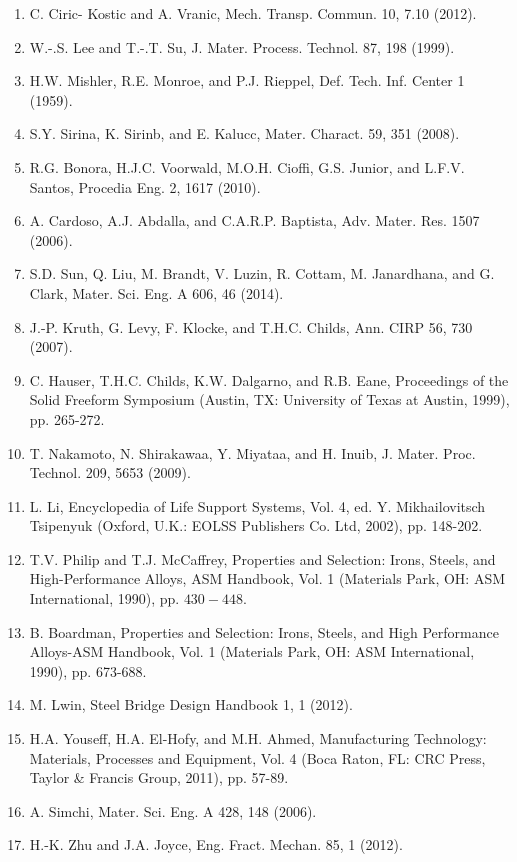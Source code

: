 \documentclass[10pt]{article}
\begin{document}
\begin{enumerate}
  \item C. Ciric- Kostic and A. Vranic, Mech. Transp. Commun. 10, 7.10 (2012).

  \item W.-.S. Lee and T.-.T. Su, J. Mater. Process. Technol. 87, 198 (1999).

  \item H.W. Mishler, R.E. Monroe, and P.J. Rieppel, Def. Tech. Inf. Center 1 (1959).

  \item S.Y. Sirina, K. Sirinb, and E. Kalucc, Mater. Charact. 59, 351 (2008).

  \item R.G. Bonora, H.J.C. Voorwald, M.O.H. Cioffi, G.S. Junior, and L.F.V. Santos, Procedia Eng. 2, 1617 (2010).

  \item A. Cardoso, A.J. Abdalla, and C.A.R.P. Baptista, Adv. Mater. Res. 1507 (2006).

  \item S.D. Sun, Q. Liu, M. Brandt, V. Luzin, R. Cottam, M. Janardhana, and G. Clark, Mater. Sci. Eng. A 606, 46 (2014).

  \item J.-P. Kruth, G. Levy, F. Klocke, and T.H.C. Childs, Ann. CIRP 56, 730 (2007).

  \item C. Hauser, T.H.C. Childs, K.W. Dalgarno, and R.B. Eane, Proceedings of the Solid Freeform Symposium (Austin, TX: University of Texas at Austin, 1999), pp. 265-272.

  \item T. Nakamoto, N. Shirakawaa, Y. Miyataa, and H. Inuib, J. Mater. Proc. Technol. 209, 5653 (2009).

  \item L. Li, Encyclopedia of Life Support Systems, Vol. 4, ed. Y. Mikhailovitsch Tsipenyuk (Oxford, U.K.: EOLSS Publishers Co. Ltd, 2002), pp. 148-202.

  \item T.V. Philip and T.J. McCaffrey, Properties and Selection: Irons, Steels, and High-Performance Alloys, ASM Handbook, Vol. 1 (Materials Park, OH: ASM International, 1990), pp. $430-448$.

  \item B. Boardman, Properties and Selection: Irons, Steels, and High Performance Alloys-ASM Handbook, Vol. 1 (Materials Park, OH: ASM International, 1990), pp. 673-688.

  \item M. Lwin, Steel Bridge Design Handbook 1, 1 (2012).

  \item H.A. Youseff, H.A. El-Hofy, and M.H. Ahmed, Manufacturing Technology: Materials, Processes and Equipment, Vol. 4 (Boca Raton, FL: CRC Press, Taylor \& Francis Group, 2011), pp. 57-89.

  \item A. Simchi, Mater. Sci. Eng. A 428, 148 (2006).

  \item H.-K. Zhu and J.A. Joyce, Eng. Fract. Mechan. 85, 1 (2012).

\end{enumerate}
\end{document}
